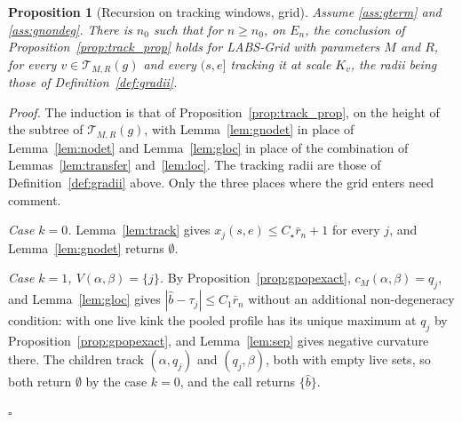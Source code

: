 \documentclass[12pt, a4paper]{article}
\newcommand{\qed}{\hfill$\square$}
\newenvironment{proof}[1][Proof]{\par\noindent\textit{#1.}\space}{\qed\par\medskip}
\newtheorem{prop}{Proposition}[section]
\begin{document}
\begin{prop}[Recursion on tracking windows, grid]
\label{prop:gtrack}
Assume \ref{ass:gterm} and \ref{ass:gnondeg}. There is $n_0$ such that for $n \ge n_0$, on $E_n$, the conclusion of Proposition~\ref{prop:track_prop} holds for LABS-Grid with parameters $M$ and $R$, for every $v \in \mathcal{T}_{M,R}(g)$ and every $(s,e]$ tracking it at scale $K_v$, the radii being those of Definition~\ref{def:gradii}.
\end{prop}

\begin{proof}
The induction is that of Proposition~\ref{prop:track_prop}, on the height of the subtree of $\mathcal{T}_{M,R}(g)$, with Lemma~\ref{lem:gnodet} in place of Lemma~\ref{lem:nodet} and Lemma~\ref{lem:gloc} in place of the combination of Lemmas~\ref{lem:transfer} and~\ref{lem:loc}. The tracking radii are those of Definition~\ref{def:gradii} above. Only the three places where the grid enters need comment.

\emph{Case $k = 0$.} Lemma~\ref{lem:track} gives
$x_j(s,e) \le C_\star\bar r_n + 1$ for every $j$, and
Lemma~\ref{lem:gnodet} returns $\emptyset$.

\emph{Case $k = 1$, $V(\alpha,\beta) = \{j\}$.} By
Proposition~\ref{prop:gpopexact}, $c_M(\alpha,\beta) = q_j$, and
Lemma~\ref{lem:gloc} gives $|\hat b - \tau_j| \le C_1\bar r_n$ without
an additional non-degeneracy condition: with one live kink the pooled profile
has its unique maximum at $q_j$ by Proposition~\ref{prop:gpopexact}, and
Lemma~\ref{lem:sep} gives negative curvature there. The children
track $(\alpha,q_j)$ and $(q_j,\beta)$, both with empty live sets, so both
return $\emptyset$ by the case $k=0$, and the call returns $\{\hat b\}$.


\end{proof}
\end{document}
